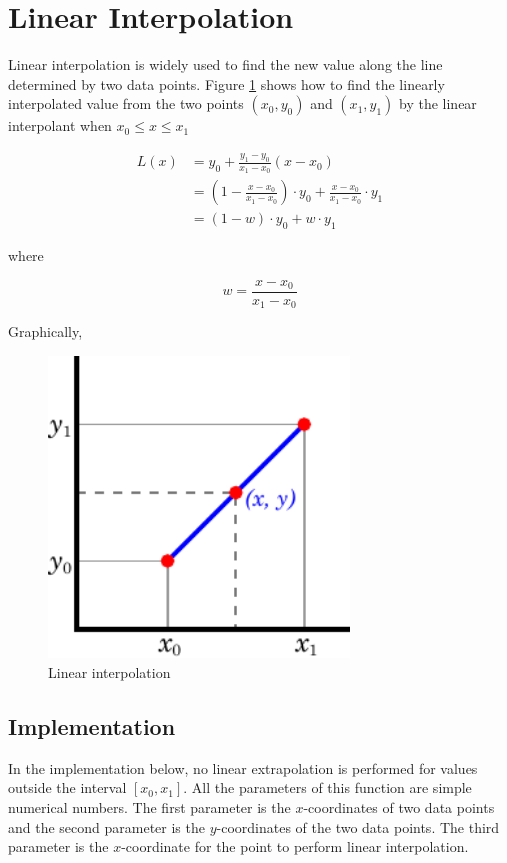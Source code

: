 \section{Linear Interpolation}
\label{example:LinearInterpolcation}

Linear interpolation is widely used to find the new value along the line determined by two data points. Figure \ref{fig:LinearInterpolation} shows how to find the linearly interpolated value from the two points $(x_0,y_0)$ and $(x_1,y_1)$ by the linear interpolant when $x_0 \le x \le x_1$

\begin{equation}
\label{eq:LinearInterpolation}
\begin{split}
L(x) &= y_0+\frac {y_1-y_0}{x_1-x_0} (x-x_0) \\
     &= \left(1-\frac{x-x_0}{x_1-x_0}\right)\cdot y_0 + \frac{x-x_0}{x_1-x_0}\cdot y_1 \\
	 &= (1-w) \cdot y_0 + w \cdot y_1
\end{split}
\end{equation}

where

$$
w = \frac{x-x_0}{x_1-x_0}
$$

Graphically,

\begin{figure}[h]
\centering
\includegraphics[width=8cm]{./figures/LinearInterpolation.pdf}
\caption{Linear interpolation}
\label{fig:LinearInterpolation}
\end{figure}


\subsection{Implementation}
In the implementation below, no linear extrapolation is performed for values outside the interval $[x_0, x_1]$. All the parameters of this function are simple numerical numbers. The first parameter is the $x$-coordinates of two data points and the second parameter is the $y$-coordinates of the two data points. The third parameter is the $x$-coordinate for the point to perform linear interpolation.

